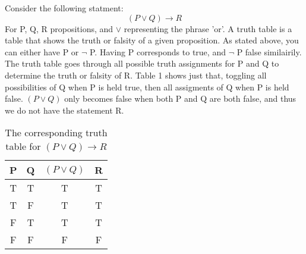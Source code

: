 \documentclass[12pt]{article}
\begin{document}
Consider the following statment: 
$$
(P \lor Q) \to R
$$ 
For P, Q, R propositions, and $\lor$ representing the phrase 'or'. A truth table is a table that shows the truth or falsity of a given proposition. As stated above, you can either have P or $\lnot$ P. Having P corresponds to true, and $\lnot$ P false similairily. The truth table goes through all possible truth assignments for P and Q to determine the truth or falsity of R. Table 1 shows just that, toggling all possibilities of Q when P is held true, then all assigments of Q when P is held false. $(P \lor Q)$ only becomes false when both P and Q are both false, and thus we do not have the statement R.  

\begin{table}
\centering
\begin{tabular}{c|c|c|c}
P & Q & $(P \lor Q)$ & R \\\hline
T & T & T & T \\\hline
T & F & T & T \\\hline
F & T & T & T \\\hline
F & F & F & F 
\end{tabular}
\caption{The corresponding truth table for $(P \lor Q) \to R$}
\end{table}
\end{document}
